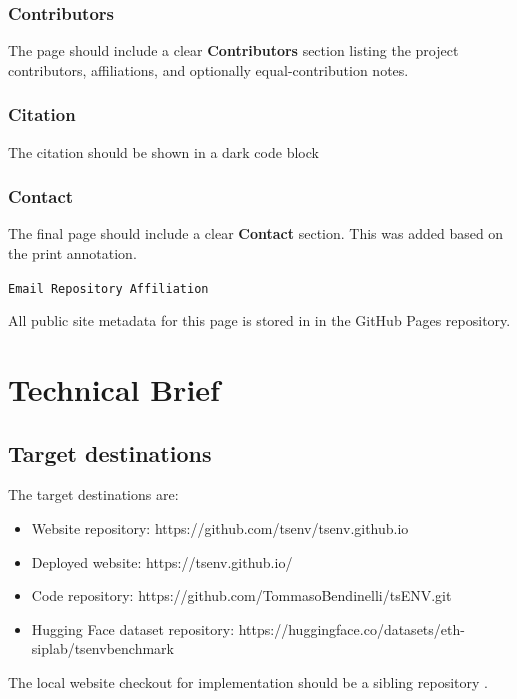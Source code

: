 \documentclass[11pt]{article}
\begin{document}
\subsubsection*{Contributors}

The page should include a clear \textbf{Contributors} section listing the project contributors, affiliations, and optionally equal-contribution notes.

\subsubsection*{Citation}

The citation should be shown in a dark code block

\subsubsection*{Contact}

The final page should include a clear \textbf{Contact} section.
This was added based on the print annotation.
\begin{center}
\texttt{Email \quad Repository \quad Affiliation}
\end{center}

All public site metadata for this page is stored in  in the GitHub Pages repository.

\label{sec:website-technical-brief}
\section*{Technical Brief}

\subsection*{Target destinations}
The target destinations are:
\begin{itemize}
\item Website repository: https://github.com/tsenv/tsenv.github.io
\item Deployed website: https://tsenv.github.io/
\item Code repository: https://github.com/TommasoBendinelli/tsENV.git
\item Hugging Face dataset repository: https://huggingface.co/datasets/eth-siplab/tsenvbenchmark
\end{itemize}
The local website checkout for implementation should be a sibling repository .
\end{document}
